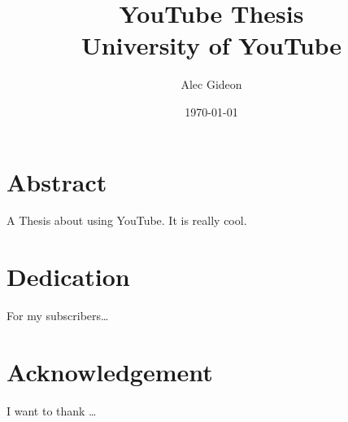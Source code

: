 \documentclass[twoside]{report}
\title{YouTube Thesis\\ 
{\Large University of YouTube}}
\author{Alec Gideon}
\date{\today}
\begin{document}
\maketitle

\chapter*{Abstract}

A Thesis about using YouTube. It is really cool.

\chapter*{Dedication}

For my subscribers\dots

\chapter*{Acknowledgement}
I want to thank \dots

\tableofcontents

\listoffigures







\appendix



\printbibliography

\printglossary[type=\acronymtype]
\end{document}
